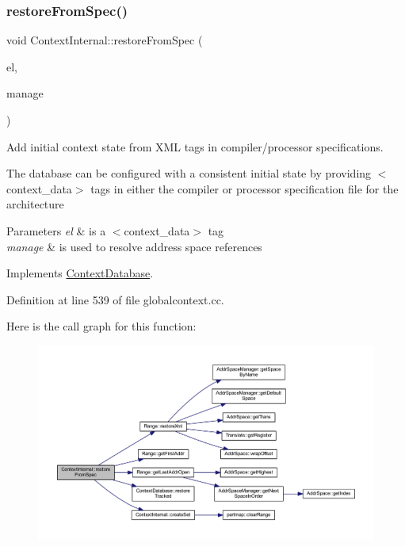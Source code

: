 \subsubsection{\texorpdfstring{restoreFromSpec()}{restoreFromSpec()}}
{\footnotesize\ttfamily void Context\+Internal\+::restore\+From\+Spec (\begin{DoxyParamCaption}\item[{const \mbox{\hyperlink{class_element}{Element}} $\ast$}]{el,  }\item[{const \mbox{\hyperlink{class_addr_space_manager}{Addr\+Space\+Manager}} $\ast$}]{manage }\end{DoxyParamCaption})\hspace{0.3cm}{\ttfamily [virtual]}}



Add initial context state from X\+ML tags in compiler/processor specifications. 

The database can be configured with a consistent initial state by providing $<$context\+\_\+data$>$ tags in either the compiler or processor specification file for the architecture 
\begin{DoxyParams}{Parameters}
{\em el} & is a $<$context\+\_\+data$>$ tag \\
\hline
{\em manage} & is used to resolve address space references \\
\hline
\end{DoxyParams}


Implements \mbox{\hyperlink{class_context_database_ab21ed86cbe093ccf2f5a81a7db4a7174}{Context\+Database}}.



Definition at line 539 of file globalcontext.\+cc.

Here is the call graph for this function\+:
\nopagebreak
\begin{figure}[H]
\begin{center}
\leavevmode
\includegraphics[width=350pt]{class_context_internal_a1b06379e4ee5c7c3105047737bb4331b_cgraph}
\end{center}
\end{figure}
\mbox{\label{class_context_internal_acaa68fc13719dbed6a06ec20d04bc6bf}} 
